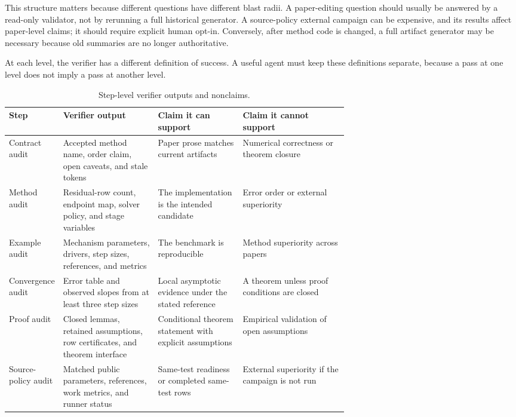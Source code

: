 \documentclass[10pt]{article}
\begin{document}
This structure matters because different questions have different blast
radii. A paper-editing question should usually be answered by a read-only
validator, not by rerunning a full historical generator. A source-policy
external campaign can be expensive, and its results affect paper-level claims;
it should require explicit human opt-in. Conversely, after method code is
changed, a full artifact generator may be necessary because old summaries are
no longer authoritative.

At each level, the verifier has a different definition of success. A useful
agent must keep these definitions separate, because a pass at one level does
not imply a pass at another level.

\begin{table}[H]
\centering
\caption{Step-level verifier outputs and nonclaims.}
\label{tab:step_verifiers}
\small
\begin{tabularx}{\linewidth}{p{0.12\linewidth}p{0.29\linewidth}p{0.25\linewidth}Y}
\toprule
\textbf{Step} & \textbf{Verifier output} & \textbf{Claim it can support} & \textbf{Claim it cannot support} \\
\midrule
Contract audit & Accepted method name, order claim, open caveats, and stale tokens & Paper prose matches current artifacts & Numerical correctness or theorem closure \\
Method audit & Residual-row count, endpoint map, solver policy, and stage variables & The implementation is the intended candidate & Error order or external superiority \\
Example audit & Mechanism parameters, drivers, step sizes, references, and metrics & The benchmark is reproducible & Method superiority across papers \\
Convergence audit & Error table and observed slopes from at least three step sizes & Local asymptotic evidence under the stated reference & A theorem unless proof conditions are closed \\
Proof audit & Closed lemmas, retained assumptions, row certificates, and theorem interface & Conditional theorem statement with explicit assumptions & Empirical validation of open assumptions \\
Source-policy audit & Matched public parameters, references, work metrics, and runner status & Same-test readiness or completed same-test rows & External superiority if the campaign is not run \\
\bottomrule
\end{tabularx}
\end{table}
\end{document}

